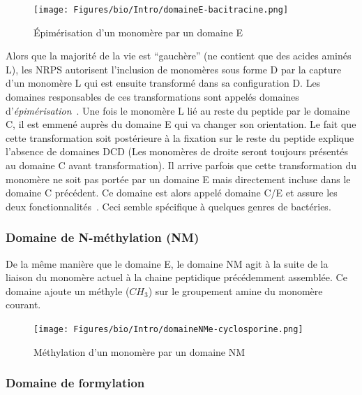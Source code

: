 \begin{figure}[h!]
  \begin{center}
    \texttt{[image: Figures/bio/Intro/domaineE-bacitracine.png]}
    \caption{\label{domaine_E}Épimérisation d'un monomère par un domaine E}
  \end{center}
\end{figure}

Alors que la majorité de la vie est ``gauchère'' (ne contient que des acides aminés L), les NRPS autorisent l'inclusion de monomères sous forme D par la capture d'un monomère L qui est ensuite transformé dans sa configuration D.
Les domaines responsables de ces transformations sont appelés domaines d'\textit{épimérisation}~\cite{calcott_portability_2015}.
Une fois le monomère L lié au reste du peptide par le domaine C, il est emmené auprès du domaine E qui va changer son orientation.
Le fait que cette transformation soit postérieure à la fixation sur le reste du peptide explique l'absence de domaines DCD (Les monomères de droite seront toujours présentés au domaine C avant transformation).
Il arrive parfois que cette transformation du monomère ne soit pas portée par un domaine E mais directement incluse dans le domaine C précédent.
Ce domaine est alors appelé domaine C/E et assure les deux fonctionnalités~\cite{yin_enduracidin_2006,balibar_generation_2005}.
Ceci semble spécifique à quelques genres de bactéries.


\subsubsection{Domaine de N-méthylation (NM)}

De la même manière que le domaine E, le domaine NM agit à la suite de la liaison du monomère actuel à la chaine peptidique précédemment assemblée.
Ce domaine ajoute un méthyle ($CH_{3}$) sur le groupement amine du monomère courant.

\begin{figure}[h!]
  \begin{center}
    \texttt{[image: Figures/bio/Intro/domaineNMe-cyclosporine.png]}
    \caption{\label{domaine_NMe}Méthylation d'un monomère par un domaine NM}
  \end{center}
\end{figure}

\subsubsection{Domaine de formylation}

